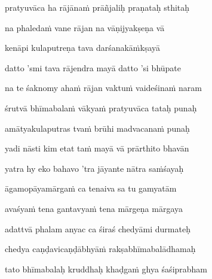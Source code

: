 pratyuvāca ha rājāna\.m prāñjaliḥ praṇataḥ sthitaḥ \veg\dontdisplaylinenum

na phaleda\.m vane rājan na vāṇijyakṣeṇa vā\thinspace{\dandab} \dontdisplaylinenum

kenāpi kulaputreṇa tava darśanakā\.mkṣayā \veg\dontdisplaylinenum

datto 'smi tava rājendra mayā datto 'si bhūpate\thinspace{\dandab} \dontdisplaylinenum

na te śaknomy aha\.m rājan vaktu\.m vaideśina\.m naram \veg\dontdisplaylinenum

śrutvā bhīmabala\.m vākya\.m pratyuvāca tataḥ punaḥ\thinspace{\dandab} \dontdisplaylinenum

amātyakulaputras tva\.m brūhi madvacana\.m punaḥ \veg\dontdisplaylinenum

yadi nāsti kim etat ta\.m mayā vā prārthito bhavān\thinspace{\dandab} \dontdisplaylinenum

yatra hy eko bahavo 'tra jāyante nātra sa\.mśayaḥ \veg\dontdisplaylinenum

āgamopāyamārga\.m ca tenaiva sa tu gamyatām\thinspace{\dandab} \dontdisplaylinenum

avaśya\.m tena gantavya\.m tena mārgeṇa mārgaya \veg\dontdisplaylinenum

adattvā phalam anyac ca śiraś chedyāmi durmateḥ\thinspace{\dandab} \dontdisplaylinenum

chedya caṇḍavicaṇḍābhyā\.m rakṣabhīmabalādhamaḥ \veg\dontdisplaylinenum

tato bhīmabalaḥ kruddhaḥ khaḍga\.m ghya śaśiprabham\thinspace{\dandab} \dontdisplaylinenum

